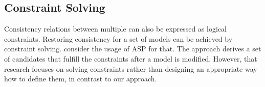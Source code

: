\subsection*{Constraint Solving}

Consistency relations between multiple \metamodels can also be expressed as logical constraints.
Restoring consistency for a set of models can be achieved by constraint solving.
\textcite{eramo2008a} consider the usage of \ac{ASP} for that. %
The approach derives a set of candidates that fulfill the constraints after a model is modified. %
However, that research focuses on solving constraints rather than designing an appropriate way how to define them, in contrast to our \commonalities approach.
